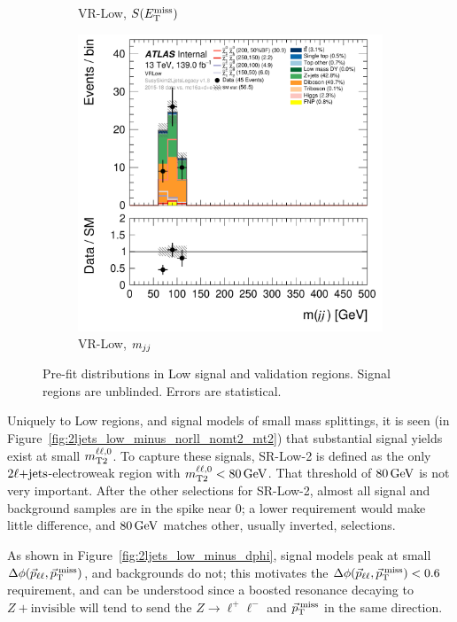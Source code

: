 \begin{figure}[tp]
\begin{subfigure}{0.48\textwidth}
\caption{VR-Low, $\metsig$}
\end{subfigure}
\hfill
\begin{subfigure}{0.48\textwidth}
\centering
\includegraphics[width=\textwidth]{figures/2ljets_def_mjj_VRLow.png}
\caption{VR-Low, $\mjj$}
\end{subfigure}
\caption[
Pre-fit distributions in Low signal and validation regions
]{%
Pre-fit distributions in Low signal and validation regions.
Signal regions are unblinded.
Errors are statistical.
}
\label{fig:2ljets_low_region}
\end{figure}

Uniquely to Low regions, and signal models of small mass splittings, it is
seen (in Figure~\ref{fig:2ljets_low_minus_norll_nomt2_mt2}) that substantial
signal yields exist at small $\mttwoll$.
To capture these signals, SR-Low-2 is defined as the only
$\twoljets$-electroweak region with $\mttwoll < 80\,\eV[G]$.
That threshold of $80\,\eV[G]$ is not very important.
After the other selections for SR-Low-2, almost all signal and background
samples are in the spike near $0$;
a lower requirement would make little difference, and $80\,\eV[G]$ matches
other, usually inverted, selections.

As shown in Figure~\ref{fig:2ljets_low_minus_dphi}, signal models peak at small
$\dphillmet$, and backgrounds do not; this motivates the $\dphillmet < 0.6$
requirement, and can be understood since a boosted resonance decaying to
$Z+\mathrm{invisible}$ will tend to send the $Z\rightarrow \ell^+\ell^-$ and
$\ptmiss$ in the same direction.

